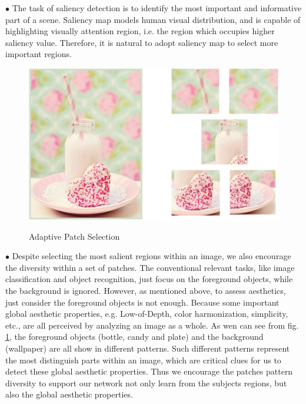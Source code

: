 \documentclass[10pt,twocolumn,letterpaper]{article}
\begin{document}
$\bullet$ The task of saliency detection is to identify the most important and informative part of a scene. Saliency map models human visual distribution,
and is capable of highlighting visually attention region, i.e. the region which
occupies higher saliency value. Therefore, it is natural to adopt saliency map
to select more important regions.

\begin{figure}
	\centering
	\includegraphics[scale=0.3]{figures/pattern.jpg}
	\label{pattern}
	\caption{Adaptive Patch Selection}
\end{figure}

$\bullet$ Despite selecting the most salient regions within an image, we also 
encourage the diversity within a set of patches. 
The conventional relevant tasks, like image classification and object 
recognition, just focus on the foreground objects, while the background 
is ignored. However, as mentioned above, to assess aesthetics, just consider 
the foreground objects is not enough. Because some important global aesthetic 
properties, e.g. Low-of-Depth, color harmonization, simplicity, etc., 
are all perceived by analyzing an image as a whole. 
As wen can see from fig. \ref{pattern}, the foreground objects 
(bottle, candy and plate) and the background (wallpaper) are all 
show in different patterns. Such different patterns represent the 
most distinguish parts within an image, which are critical clues
for us to detect these global aesthetic properties. Thus we encourage
the patches pattern diversity to support our network not only learn from the subjects regions, but also the global aesthetic properties.
\end{document}
